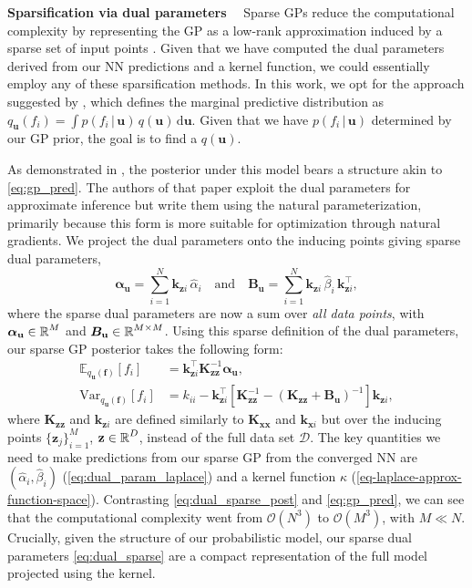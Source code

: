\documentclass{article}
\renewcommand{\paragraph}[1]{{\bf #1}~~}
\newcommand{\dataset}{\ensuremath{\mathcal{D}}}
\newcommand{\mathbold}[1]{\bm{#1}}
\newcommand{\mbf}[1]{\mathbf{#1}}
\renewcommand{\mid}{\,|\,}
\newcommand{\T}{\top}
\newcommand{\valpha}[0]{\mathbold{\alpha}}
\newcommand{\MBeta}[0]{\mathbold{B}}
\newcommand{\vz}{\mbf{z}}
\newcommand{\vf}{\mbf{f}}
\newcommand{\vu}{\mbf{u}}
\newcommand{\vx}{\mbf{x}}
\newcommand{\MKzz}{\mbf{K}_{\mbf{z}\mbf{z}}}
\newcommand{\MKxx}{\mbf{K}_{\mbf{x}\mbf{x}}}
\newcommand{\vkzi}{\mbf{k}_{\mbf{z}i}}
\newcommand{\vkzs}{\mbf{k}_{\mbf{z}i}}
\newcommand{\vk}{\mbf{k}}
\newcommand{\myexpect}{\mathbb{E}}
\begin{document}
\paragraph{Sparsification via dual parameters}
\label{sec:sparse-dual-gp}
%
Sparse GPs reduce the computational complexity by representing the GP as a low-rank approximation induced by a sparse set of input points \citep[see][for an early overview]{quinonero2005unifying}. Given that we have computed the dual parameters derived from our NN predictions and a kernel function, we could essentially employ any of these sparsification methods. In this work, we opt for the approach suggested by \citet{titsias2009variational} \citep[also used in the DTC approximation, see][]{quinonero2005unifying}, which defines the marginal predictive distribution as $q_{\vu}(f_i)  = \int p(f_i  \mid \vu) \, q(\vu) \, \mathrm{d}\vu$. Given that we have $p(f_i \mid \vu)$ determined by our GP prior, the goal is to find a $q(\vu)$.

As demonstrated in \citet{adam2021dual}, the posterior under this model bears a structure akin to \cref{eq:gp_pred}. The authors of that paper exploit the dual parameters for approximate inference but write them using the natural parameterization, primarily because this form is more suitable for optimization through natural gradients.
We project the dual parameters onto the inducing points giving sparse dual parameters,
%
\begin{equation} \textstyle
  \valpha_{\vu}  =  \sum_{i=1}^N  \vkzi \, \hat{\alpha}_{i}
  \quad \text{and} \quad
  \MBeta_{\vu} =  \sum_{i=1}^N \vkzi \,\hat{\beta}_{i} \, \vkzi^{\T} ,
\label{eq:dual_sparse}
\end{equation}
%
where the sparse dual parameters are now a sum over \emph{all data points}, with $\valpha_{\vu} \in \R^{M}$ and $\MBeta_{\vu} \in \R^{M  \times M}$. Using this sparse definition of the dual parameters, our sparse GP posterior takes the following form:
\begin{align}\label{eq:dual_sparse_post}
   \myexpect_{q_{\vu}(\vf)}[f_i] &= \vkzs^{\T} \MKzz^{-1} \valpha_{\vu}, \\
   \textrm{Var}_{q_{\vu}(\vf)}[f_i]  &= k_{ii} - \vkzs^\top [\MKzz^{-1} - (\MKzz + \MBeta_{\vu})^{-1} ]\vkzs, \nonumber
\end{align}
where $\MKzz$ and $\vkzs$ are defined similarly to $\MKxx$ and $\vk_{\vx i}$ but over the inducing points $\{\vz_j\}_{i=1}^M$, $\vz \in \R^{D}$, instead of the full data set $\dataset$. The key quantities we need to make predictions from our sparse GP from the converged NN are $(\hat{\alpha}_i, \hat{\beta}_i)$ (\cref{eq:dual_param_laplace}) and a kernel function $\kappa$ (\cref{eq-laplace-approx-function-space}). Contrasting \cref{eq:dual_sparse_post} and \cref{eq:gp_pred}, we can see that the computational complexity went from $\mathcal{O}(N^3)$ to $\mathcal{O}(M^3)$, with $M \ll N$.  Crucially, given the structure of our probabilistic model, our sparse dual parameters \cref{eq:dual_sparse} are a compact representation of the full model projected using the kernel.
\end{document}
